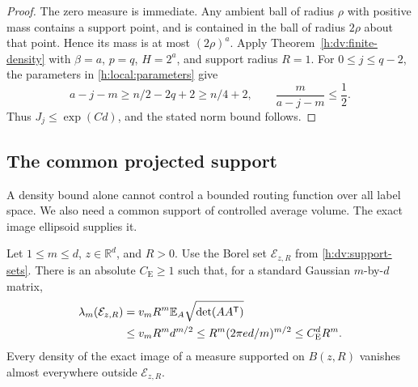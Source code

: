 \begin{proof}
The zero measure is immediate. Any ambient ball of radius \(\rho\)
with positive mass contains a support point, and is contained in
the ball of radius \(2\rho\) about that point. Hence its mass is at
most \((2\rho)^a\). Apply Theorem~\ref{h:dv:finite-density} with
\(\beta=a\), \(p=q\), \(H=2^a\), and support radius \(R=1\).
For \(0\le j\le q-2\), the parameters in
\eqref{h:local:parameters} give
\begin{equation}\label{h:proj:margin}
 a-j-m\ge n/2-2q+2\ge n/4+2,
 \qquad \frac{m}{a-j-m}\le\frac12.
\end{equation}
Thus \(J_j\le\exp(Cd)\), and the stated norm bound follows.
\end{proof}

\subsection{The common projected support}

A density bound alone cannot control a bounded routing function over
all label space. We also need a common support of controlled average
volume. The exact image ellipsoid supplies it.

\begin{lemma}
\label{h:ev:ellipsoid}
Let \(1\le m\le d\), \(z\in\mathbb R^d\), and \(R>0\).  Use the Borel set \(\mathcal E_{z,R}\) from
\eqref{h:dv:support-sets}.  There is an absolute
\(C_{\mathrm E}\ge1\) such that, for a standard Gaussian
\(m\)-by-\(d\) matrix,
\begin{align}
 \lambda_m(\mathcal E_{z,R})
 &=v_mR^m\mathbb E_A\sqrt{\det(AA^{\mathsf T})}
 \notag\\
 &\le v_mR^m d^{m/2}
 \le R^m(2\pi e d/m)^{m/2}
 \le C_{\mathrm E}^dR^m .
 \label{h:ev:ellipsoid-volume}
\end{align}
Every density of the exact image of a measure supported on \(B(z,R)\)
vanishes almost everywhere outside \(\mathcal E_{z,R}\).
\end{lemma}

